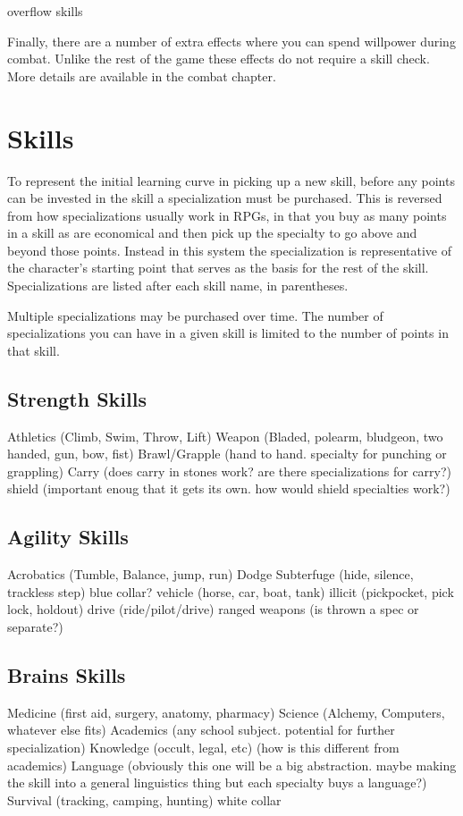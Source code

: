 \documentclass[twocolumn]{report}
\begin{document}
overflow skills

Finally, there are a number of extra effects where you can spend willpower during combat.  Unlike the rest of the game these effects do not require a skill check.  More details are available in the combat chapter.
\chapter{Skills} 
To represent the initial learning curve in picking up a new skill, before any points can be invested in the skill a specialization must be purchased.  This is reversed from how specializations usually work in RPGs, in that you buy as many points in a skill as are economical and then pick up the specialty to go above and beyond those points.  Instead in this system the specialization is representative of the character's starting point that serves as the basis for the rest of the skill.  Specializations are listed after each skill name, in parentheses.

Multiple specializations may be purchased over time.  The number of specializations you can have in a given skill is limited to the number of points in that skill.

\section{Strength Skills}
Athletics (Climb, Swim, Throw, Lift)
Weapon (Bladed, polearm, bludgeon, two handed, gun, bow, fist)
Brawl/Grapple (hand to hand.  specialty for punching or grappling)
Carry (does carry in stones work?  are there specializations for carry?)
shield (important enoug that it gets its own.  how would shield specialties work?)

\section{Agility Skills}
Acrobatics (Tumble, Balance, jump, run)
Dodge
Subterfuge (hide, silence, trackless step)
blue collar?
vehicle (horse, car, boat, tank)
illicit (pickpocket, pick lock, holdout)
drive (ride/pilot/drive)
ranged weapons (is thrown a spec or separate?)

\section{Brains Skills}
Medicine (first aid, surgery, anatomy, pharmacy)
Science (Alchemy, Computers, whatever else fits)
Academics (any school subject.  potential for further specialization)
Knowledge (occult, legal, etc) (how is this different from academics)
Language (obviously this one will be a big abstraction.  maybe making the skill into a general linguistics thing but each specialty buys a language?)
Survival (tracking, camping, hunting)
white collar
\end{document}
